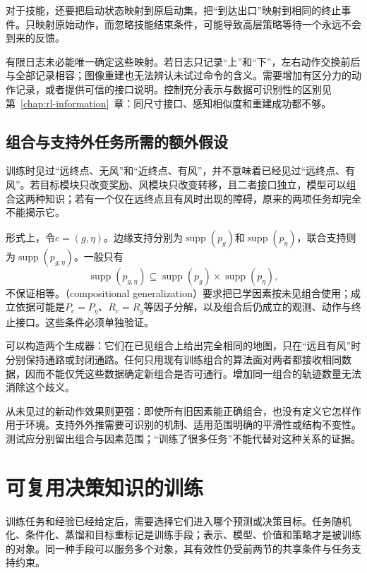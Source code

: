 对于技能，还要把启动状态映射到原启动集，把“到达出口”映射到相同的终止事件。只映射原始动作，而忽略技能结束条件，可能导致高层策略等待一个永远不会到来的反馈。

有限日志未必能唯一确定这些映射。若日志只记录“上”和“下”，左右动作交换前后与全部记录相容；图像重建也无法辨认未试过命令的含义。需要增加有区分力的动作记录，或者提供可信的接口说明。控制充分表示与数据可识别性的区别见第~\ref{chap:rl-information}~章：同尺寸接口、感知相似度和重建成功都不够。

\subsection{组合与支持外任务所需的额外假设}
\label{sec:rl-transfer-composition}

训练时见过“远终点、无风”和“近终点、有风”，并不意味着已经见过“远终点、有风”。若目标模块只改变奖励、风模块只改变转移，且二者接口独立，模型可以组合这两种知识；若有一个仅在远终点且有风时出现的障碍，原来的两项任务却完全不能揭示它。

形式上，令$c=(g,\eta)$。边缘支持分别为$\operatorname{supp}(p_g)$和$\operatorname{supp}(p_\eta)$，联合支持则为$\operatorname{supp}(p_{g,\eta})$。一般只有
\[
 \operatorname{supp}(p_{g,\eta})
 \subseteq \operatorname{supp}(p_g)\times\operatorname{supp}(p_\eta),
\]
不保证相等。（compositional generalization）要求把已学因素按未见组合使用；成立依据可能是$P_c=P_\eta$、$R_c=R_g$等因子分解，以及组合后仍成立的观测、动作与终止接口。这些条件必须单独验证。

可以构造两个生成器：它们在已见组合上给出完全相同的地图，只在“远且有风”时分别保持通路或封闭通路。任何只用现有训练组合的算法面对两者都接收相同数据，因而不能仅凭这些数据确定新组合是否可通行。增加同一组合的轨迹数量无法消除这个歧义。

从未见过的新动作效果则更强：即使所有旧因素能正确组合，也没有定义它怎样作用于环境。支持外外推需要可识别的机制、适用范围明确的平滑性或结构不变性。测试应分别留出组合与因素范围；“训练了很多任务”不能代替对这种关系的证据。

\section{可复用决策知识的训练}
\label{sec:rl-transfer-training}

训练任务和经验已经给定后，需要选择它们进入哪个预测或决策目标。任务随机化、条件化、蒸馏和目标重标记是训练手段；表示、模型、价值和策略才是被训练的对象。同一种手段可以服务多个对象，其有效性仍受前两节的共享条件与任务支持约束。

